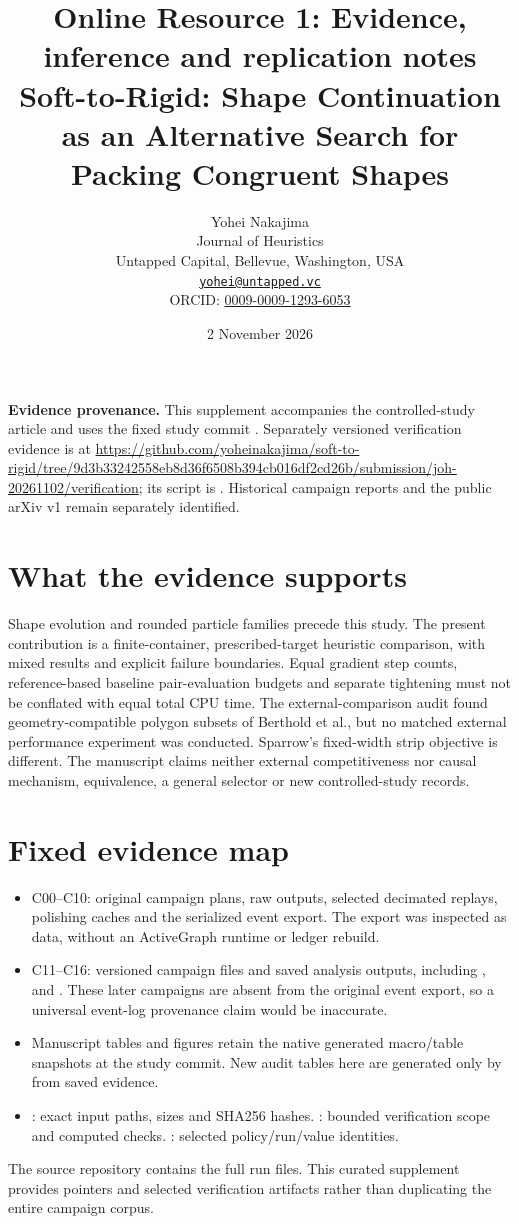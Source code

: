 \documentclass[11pt]{article}
\title{Online Resource 1: Evidence, inference and replication notes\\Soft-to-Rigid: Shape Continuation as an Alternative Search for Packing Congruent Shapes}
\author{Yohei Nakajima\\\small Journal of Heuristics\\\small Untapped Capital, Bellevue, Washington, USA\\\small \href{mailto:yohei@untapped.vc}{\texttt{yohei@untapped.vc}}\\\small ORCID: \href{https://orcid.org/0009-0009-1293-6053}{0009-0009-1293-6053}}
\date{2 November 2026}
\begin{document}
\sloppy
\maketitle
\noindent\textbf{Evidence provenance.} This supplement accompanies the controlled-study article and uses the fixed study commit . Separately versioned verification evidence is at \url{https://github.com/yoheinakajima/soft-to-rigid/tree/9d3b33242558eb8d36f6508b394cb016df2cd26b/submission/joh-20261102/verification}; its script is . Historical campaign reports and the public arXiv v1 remain separately identified.

\section{What the evidence supports}
Shape evolution and rounded particle families precede this study. The present contribution is a finite-container, prescribed-target heuristic comparison, with mixed results and explicit failure boundaries. Equal gradient step counts, reference-based baseline pair-evaluation budgets and separate tightening must not be conflated with equal total CPU time. The external-comparison audit found geometry-compatible polygon subsets of Berthold et al., but no matched external performance experiment was conducted. Sparrow's fixed-width strip objective is different. The manuscript claims neither external competitiveness nor causal mechanism, equivalence, a general selector or new controlled-study records.

\section{Fixed evidence map}
\begin{itemize}
\item C00--C10: original campaign plans, raw outputs, selected decimated replays, polishing caches and the serialized event export. The export was inspected as data, without an ActiveGraph runtime or ledger rebuild.
\item C11--C16: versioned campaign files and saved analysis outputs, including ,  and . These later campaigns are absent from the original event export, so a universal event-log provenance claim would be inaccurate.
\item Manuscript tables and figures retain the native generated macro/table snapshots at the study commit. New audit tables here are generated only by  from saved evidence.
\item {}: exact input paths, sizes and SHA256 hashes. : bounded verification scope and computed checks. : selected policy/run/value identities.
\end{itemize}
The source repository contains the full run files. This curated supplement provides pointers and selected verification artifacts rather than duplicating the entire campaign corpus.
\end{document}

